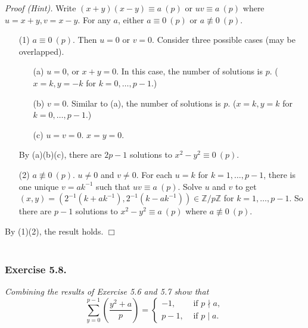 \documentclass{article}
\begin{document}
\emph{Proof (Hint).}
Write $(x+y)(x-y) \equiv a \: (p)$ or $uv \equiv a \: (p)$ where $u=x+y, v=x-y$.
For any $a$, either $a \equiv 0 \: (p)$ or $a \not\equiv 0 \: (p)$.
\begin{enumerate}
\item[(1)]
$a \equiv 0 \: (p)$. Then $u = 0$ or $v = 0$.
Consider three possible cases (may be overlapped).
  \begin{enumerate}
  \item[(a)]
  $u = 0$, or $x+y = 0$. In this case, the number of solutions is $p$.
  ($x = k, y = -k$ for $k = 0, \ldots, p-1$.)
  \item[(b)]
  $v = 0$. Similar to (a), the number of solutions is $p$.
  ($x = k, y = k$ for $k = 0, \ldots, p-1$.)
  \item[(c)]
  $u = v = 0$. $x = y = 0$.
  \end{enumerate}
  By (a)(b)(c), there are $2p-1$ solutions to $x^2 - y^2 \equiv 0 \: (p)$.
\item[(2)]
$a \not\equiv 0 \: (p)$. $u \neq 0$ and $v \neq 0$.
For each $u = k$ for $k = 1, \ldots, p-1$, there is one unique $v = a k^{-1}$
such that $uv \equiv a \: (p)$. Solve $u$ and $v$ to get
$(x, y) = (2^{-1} (k + a k^{-1}), 2^{-1} (k - a k^{-1})) \in \mathbb{Z}/p\mathbb{Z}$
for $k = 1, \ldots, p-1$.
So there are $p-1$ solutions to $x^2 - y^2 \equiv a \: (p)$ where $a \not\equiv 0 \: (p)$.
\end{enumerate}
By (1)(2), the result holds.
$\Box$ \\\\






\subsubsection*{Exercise 5.8.}
\emph{Combining the results of Exercise 5.6 and 5.7 show that
\begin{equation*}
  \sum_{y=0}^{p-1} \left( \frac{y^2 + a}{p} \right) =
    \begin{cases}
      -1,  & \text{ if $p \nmid a$}, \\
      p-1, & \text{ if $p \mid a$}.
    \end{cases}
\end{equation*}} \\
\end{document}
